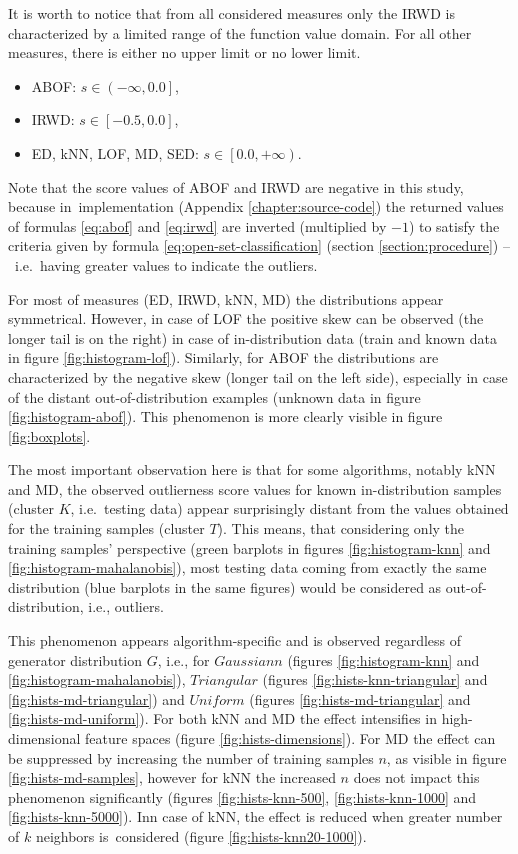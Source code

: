 It is worth to notice that from all considered measures only the IRWD is characterized by a limited range of the function value domain. For all other measures, there is either no upper limit or no lower limit.
\vspace{-0.5\baselineskip}
\begin{itemize}
    \item ABOF: $s \in \left(-\infty, 0.0\right]$,
    \item IRWD: $s \in \left[-0.5, 0.0\right]$,
    \item ED, kNN, LOF, MD, SED: $s \in \left[0.0, +\infty\right)$.
\end{itemize}
\vspace{-0.5\baselineskip}
Note that the score values of ABOF and IRWD are negative in this study, because in~implementation (Appendix \ref{chapter:source-code}) the returned values of formulas \ref{eq:abof} and \ref{eq:irwd} are inverted (multiplied by $-1$) to satisfy the criteria given by formula \ref{eq:open-set-classification} (section \ref{section:procedure}) –~i.e.~having greater values to indicate the outliers.

For most of measures (ED, IRWD, kNN, MD) the distributions appear symmetrical. However, in case of LOF the positive skew can be observed (the longer tail is on the right) in case of in-distribution data (train and known data in figure \ref{fig:histogram-lof}). Similarly, for ABOF the distributions are characterized by the negative skew (longer tail on the left side), especially in case of the distant out-of-distribution examples (unknown data in figure \ref{fig:histogram-abof}). This phenomenon is more clearly visible in figure \ref{fig:boxplots}.

The most important observation here is that for some algorithms, notably kNN and MD, the observed outlierness score values for known in-distribution samples (cluster $K$, i.e.~testing data) appear surprisingly distant from the values obtained for the training samples (cluster $T$). This means, that considering only the training samples' perspective (green barplots in figures \ref{fig:histogram-knn} and \ref{fig:histogram-mahalanobis}), most testing data coming from exactly the same distribution (blue barplots in the same figures) would be considered as out-of-distribution, i.e., outliers.

This phenomenon appears algorithm-specific and is observed regardless of generator distribution $G$, i.e., for $\textit{Gaussiann}$ (figures \ref{fig:histogram-knn} and \ref{fig:histogram-mahalanobis}), $\textit{Triangular}$ (figures \ref{fig:hists-knn-triangular} and \ref{fig:hists-md-triangular}) and $\textit{Uniform}$ (figures \ref{fig:hists-md-triangular} and \ref{fig:hists-md-uniform}). For both kNN and MD the effect intensifies in high-dimensional feature spaces (figure \ref{fig:hists-dimensions}). For MD the effect can be suppressed by increasing the number of training samples $n$, as visible in figure \ref{fig:hists-md-samples}, however for kNN the increased $n$ does not impact this phenomenon significantly (figures \ref{fig:hists-knn-500}, \ref{fig:hists-knn-1000} and \ref{fig:hists-knn-5000}). Inn case of kNN, the effect is reduced when greater number of $k$ neighbors is~considered (figure \ref{fig:hists-knn20-1000}).

